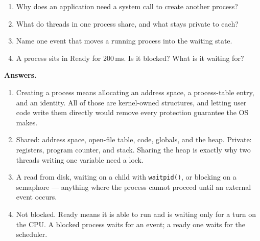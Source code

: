 \begin{quickcheck}
\begin{enumerate}
  \item Why does an application need a system call to create another process?
  \item What do threads in one process share, and what stays private to each?
  \item Name one event that moves a running process into the waiting state.
  \item A process sits in Ready for 200\,ms. Is it blocked? What is it waiting for?
\end{enumerate}

\medskip\noindent\textbf{Answers.}
\begin{enumerate}
  \item Creating a process means allocating an address space, a process-table entry, and an identity. All of those are kernel-owned structures, and letting user code write them directly would remove every protection guarantee the OS makes.
  \item Shared: address space, open-file table, code, globals, and the heap. Private: registers, program counter, and stack. Sharing the heap is exactly why two threads writing one variable need a lock.
  \item A read from disk, waiting on a child with \texttt{waitpid()}, or blocking on a semaphore --- anything where the process cannot proceed until an external event occurs.
  \item Not blocked. Ready means it is able to run and is waiting only for a turn on the CPU. A blocked process waits for an event; a ready one waits for the scheduler.
\end{enumerate}
\end{quickcheck}
